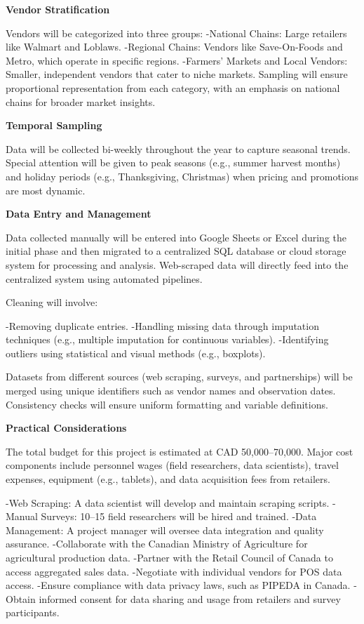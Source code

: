 \documentclass[
  letterpaper,
  DIV=11,
  numbers=noendperiod]{scrartcl}
\begin{document}
\textbf{Vendor Stratification}

Vendors will be categorized into three groups: -National Chains: Large
retailers like Walmart and Loblaws. -Regional Chains: Vendors like
Save-On-Foods and Metro, which operate in specific regions. -Farmers'
Markets and Local Vendors: Smaller, independent vendors that cater to
niche markets. Sampling will ensure proportional representation from
each category, with an emphasis on national chains for broader market
insights.

\textbf{Temporal Sampling}

Data will be collected bi-weekly throughout the year to capture seasonal
trends. Special attention will be given to peak seasons (e.g., summer
harvest months) and holiday periods (e.g., Thanksgiving, Christmas) when
pricing and promotions are most dynamic.

\textbf{Data Entry and Management}

Data collected manually will be entered into Google Sheets or Excel
during the initial phase and then migrated to a centralized SQL database
or cloud storage system for processing and analysis. Web-scraped data
will directly feed into the centralized system using automated
pipelines.

Cleaning will involve:

-Removing duplicate entries. -Handling missing data through imputation
techniques (e.g., multiple imputation for continuous variables).
-Identifying outliers using statistical and visual methods (e.g.,
boxplots).

Datasets from different sources (web scraping, surveys, and
partnerships) will be merged using unique identifiers such as vendor
names and observation dates. Consistency checks will ensure uniform
formatting and variable definitions.

\textbf{Practical Considerations}

The total budget for this project is estimated at CAD 50,000--70,000.
Major cost components include personnel wages (field researchers, data
scientists), travel expenses, equipment (e.g., tablets), and data
acquisition fees from retailers.

-Web Scraping: A data scientist will develop and maintain scraping
scripts. -Manual Surveys: 10--15 field researchers will be hired and
trained. -Data Management: A project manager will oversee data
integration and quality assurance. -Collaborate with the Canadian
Ministry of Agriculture for agricultural production data. -Partner with
the Retail Council of Canada to access aggregated sales data. -Negotiate
with individual vendors for POS data access. -Ensure compliance with
data privacy laws, such as PIPEDA in Canada. -Obtain informed consent
for data sharing and usage from retailers and survey participants.
\end{document}
